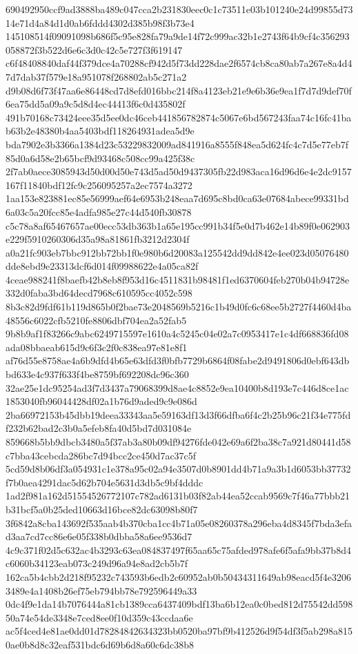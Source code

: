 \documentclass[11pt,a4paper]{article}
\begin{document}
{690492950ccf9ad3888ba489c047cca2b231830eec0c1c73511e03b101240e24d99855d7314e71d4a84d1d0ab6fddd4302d385b98f3b73e4
145108514f09091098b686f5c95e828fa79a9de14f72c999ac32b1e2743f64b9cf4c356293058872f3b522d6e6c3d0c42c5e727f3f619147
c6f48408840daf44f379dce4a70288cf942d5f73dd228dae2f6574cb8ca80ab7a267e8a4d47d7dab37f579e18a951078f268802ab5c271a2
d9b08d6f73f47aa6e86448cd7d8efd016bbc214f8a4123eb21e9e6b36e9ea1f7d7d9def70f6ea75dd5a09a9c5d8d4ec44413f6c0d435802f
491b70168c73424eee35d5ee0dc46ceb441856782874c5067e6bd567243faa74c16fc41bab63b2e48380b4aa5403bdf118264931adea5d9e
bda7902e3b3366a1384d23c53229832009ad841916a8555f848ea5d624fc4c7d5e77eb7f85d0a6d58e2b65bcf9d93468c508cc99a425f38c
2f7ab0aece3085943d50d00d50e743d5ad50d9437305fb22d983aca16d96d6e4e2dc9157167f11840bdf12fc9c256095257a2ec7574a3272
1aa153e823881ec85e56999aef64e6953b248eaa7d695c8bd0ca63e07684abece99331bd6a03c5a20fcc85e4adfa985e27c44d540fb30878
c5c78a8af65467657ae00ecc53db363b1a65e195cc991b34f5e0d7b462e14b89f0e062903e229f5910260306d35a98a81861fb3212d2304f
a0a21fc903eb7bbc912bb72bb1f0e980b6d20083a125542dd9dd842e4ee023d05076480dde8ebd9e23313dcf6d014f09988622e4a05ca82f
4ceae988241f8baefb42b8eb8f953d16c4511831b98481f1ed6370604feb270b04b94728e332d0faba3bd64decd7968c610595cc4052c598
8b3c82d9fdf61b119d865b0f2bae73e2048569b5216c1b49d0fc6c68ee5b2727f4460d4ba48556c6022cfb5210fe8806dbf704ea2a52fab5
9b8b9af1f83266c9abc6249715597e1610a4c5245c04e02a7c0953417e1c4df668836fd08ada08bbaeab615d9c6f3c2f0c838ea97e81e8f1
af76d55e8758ae4a6b9dfd4b65e63dfd3f0bfb7729b6864f08fabe2d9491806d0ebf643dbbd633e4c937f633f4be8759bf692208dc96c360
32ae25e1dc95254ad3f7d3437a79068399d8ae4c8852e9ea10400b8d193e7c446d8ce1ac1853040fb96044428df02a1b76d9aded9c9e086d
2ba66972153b45dbb19deea33343aa5e59163df13d3f66dfba6f4c2b25b96c21f34e775fdf232b62bad2c3b0a5efeb8fa40d5bd7d031084e
859668b5bb9dbcb3480a5f37ab3a80b09df94276fde042e69a6f2ba38c7a921d80441d58c7bba43cebcda286bc7d94bcc2ce450d7ac37c5f
5cd59d8b06df3a054931c1e378a95c02a94e3507d0b8901dd4b71a9a3b1d6053bb37732f7b0aea4291dac5d62b704e5631d3db5c9bf4dddc
1ad2f981a162d51554526772107c782ad6131b03f82ab44ea52ccab9569c7f46a77bbb21b31bcf5a0b25ded10663d16bce82dc63098b80f7
3f6842a8cba143692f535aab4b370cba1cc4b71a05e08260378a296eba4d8345f7bda3efad3aa7cd7cc86e6e05f338b0dbba58a6ee9536d7
4c9c371f02d5c632ac4b3293c63ea084837497f65aa65c75afded978afe6f5afa9bb37b8d4c6060b34123eab073c249d96a94e8ad2cb5b7f
162ca5b4cbb2d218f95232c743593b6edb2c60952ab0b50434311649ab98eacd5f4e32063489e4a1408b26ef75eb794bb78e792596449a33
0dc4f9e1da14b7076444a81cb1389cca6437409bdf13ba6b12ea0c0bed812d75542dd59850a74e54de3348e7ced8ee0f10d359c43ccdaa6e
ac5f4ced4e81ae0dd01d78284842634323bb0520ba97bf9b412526d9f54df3f5ab298a8150ae0b8d8c32eaf531bdc6d69b6d8a60c6dc38b8
}
\end{document}
